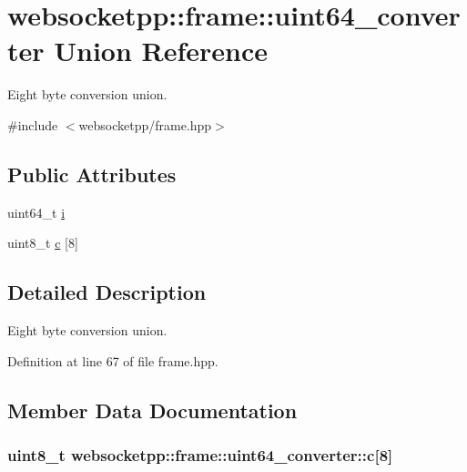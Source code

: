 \hypertarget{unionwebsocketpp_1_1frame_1_1uint64__converter}{}\section{websocketpp\+:\+:frame\+:\+:uint64\+\_\+converter Union Reference}
\label{unionwebsocketpp_1_1frame_1_1uint64__converter}


Eight byte conversion union.  




{\ttfamily \#include $<$websocketpp/frame.\+hpp$>$}

\subsection*{Public Attributes}
\begin{DoxyCompactItemize}
\item 
uint64\+\_\+t \hyperlink{unionwebsocketpp_1_1frame_1_1uint64__converter_a5440031a82ed910e25f6d75c59ab0a88}{i}
\item 
uint8\+\_\+t \hyperlink{unionwebsocketpp_1_1frame_1_1uint64__converter_a9d9e78c8c89d1eff191debf97f067731}{c} \mbox{[}8\mbox{]}
\end{DoxyCompactItemize}


\subsection{Detailed Description}
Eight byte conversion union. 

Definition at line 67 of file frame.\+hpp.



\subsection{Member Data Documentation}
\hypertarget{unionwebsocketpp_1_1frame_1_1uint64__converter_a9d9e78c8c89d1eff191debf97f067731}{}
\subsubsection[{c}]{\setlength{\rightskip}{0pt plus 5cm}uint8\+\_\+t websocketpp\+::frame\+::uint64\+\_\+converter\+::c\mbox{[}8\mbox{]}}\label{unionwebsocketpp_1_1frame_1_1uint64__converter_a9d9e78c8c89d1eff191debf97f067731}


